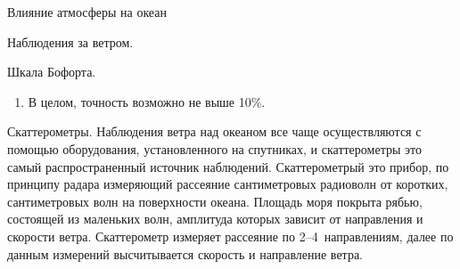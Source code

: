 \begin{chapter}{Влияние атмосферы на океан}
\begin{section}{Наблюдения за ветром.}
\begin{paragraph}{Шкала Бофорта.}
\begin{enumerate}
\item
В целом, точность возможно не выше 10\%.
\end{enumerate}
%

\end{paragraph}

\begin{paragraph}{Скаттерометры.}
Наблюдения ветра над океаном все чаще осуществляются с помощью
оборудования, установленного на спутниках, и скаттерометры это самый
распространенный источник наблюдений. Скаттерометрый это прибор, по
принципу радара измеряющий рассеяние сантиметровых радиоволн от
коротких, сантиметровых волн на поверхности океана. Площадь моря
покрыта рябью, состоящей из маленьких волн, амплитуда которых зависит
от направления и скорости ветра. Скаттерометр измеряет рассеяние по
2--4~направлениям, далее по данным измерений высчитывается скорость
и направление ветра.
%


\end{paragraph}
\end{section}
\end{chapter}
